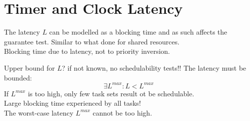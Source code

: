 \chapter{Timer and Clock Latency}

The latency $L$ can be modelled as a blocking time and as such affects the guarantee test.
Similar to what done for shared resources. \\
Blocking time due to latency, not to priority inversion.

Upper bound for $L$? if not known, no schedulability tests!!
The latency must be bounded:
\[\exists L^{max}: L < L^{max}\]
If $L^{max}$ is too high, only few task sets result ot be schedulable.\\
Large blocking time experienced by all tasks!\\
The worst-case latency $L^{max}$ cannot be too high.

